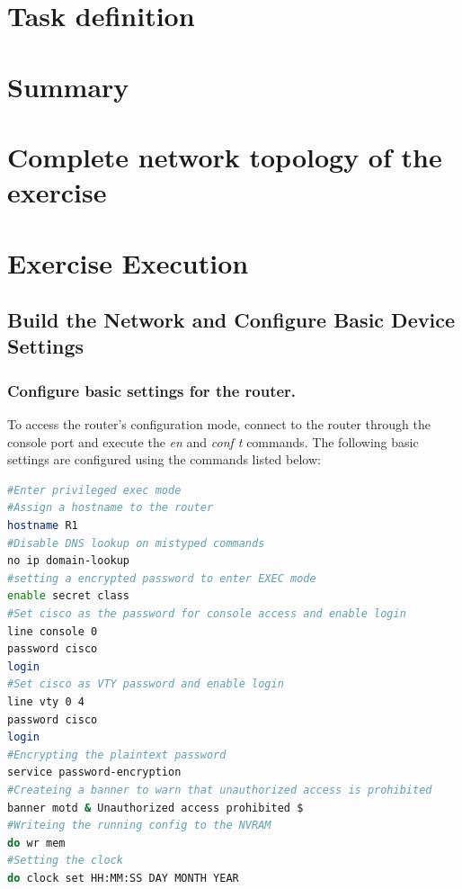\documentclass[a4paper]{article}
\newcommand{\abc}{\hfill \break}
\newcommand{\ii}{\textit}
\begin{document}
\newpage

\section{Task definition}


\section{Summary}


\newpage

\section{Complete network topology of the exercise}

\newpage

\section{Exercise Execution}

\subsection{Build the Network and Configure Basic Device Settings}

\subsubsection{Configure basic settings for the router.}
To access the router's configuration mode, connect to the router through the console port and execute the \ii{en} and \ii{conf t} commands.\abc
The following basic settings are configured using the commands listed below:
\begin{lstlisting}[language=bash]
#Enter privileged exec mode
#Assign a hostname to the router
hostname R1
#Disable DNS lookup on mistyped commands
no ip domain-lookup
#setting a encrypted password to enter EXEC mode
enable secret class
#Set cisco as the password for console access and enable login
line console 0
password cisco
login
#Set cisco as VTY password and enable login
line vty 0 4
password cisco
login
#Encrypting the plaintext password
service password-encryption
#Createing a banner to warn that unauthorized access is prohibited
banner motd & Unauthorized access prohibited $
#Writeing the running config to the NVRAM
do wr mem
#Setting the clock
do clock set HH:MM:SS DAY MONTH YEAR
\end{lstlisting}
\end{document}
